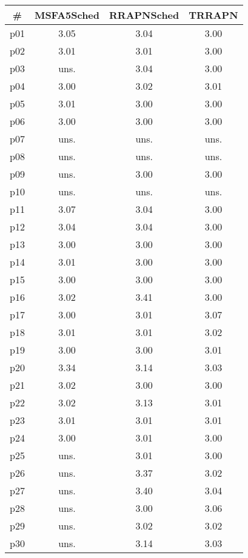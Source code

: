 \begin{tabular}{cccc}
\toprule
\textbf{\#} & \textbf{MSFA5Sched} & \textbf{RRAPNSched} & \textbf{TRRAPN}\\
\midrule
p01 & 3.05 & 3.04 & 3.00\\
p02 & 3.01 & 3.01 & 3.00\\
p03 & uns. & 3.04 & 3.00\\
p04 & 3.00 & 3.02 & 3.01\\
p05 & 3.01 & 3.00 & 3.00\\
p06 & 3.00 & 3.00 & 3.00\\
p07 & uns. & uns. & uns.\\
p08 & uns. & uns. & uns.\\
p09 & uns. & 3.00 & 3.00\\
p10 & uns. & uns. & uns.\\
p11 & 3.07 & 3.04 & 3.00\\
p12 & 3.04 & 3.04 & 3.00\\
p13 & 3.00 & 3.00 & 3.00\\
p14 & 3.01 & 3.00 & 3.00\\
p15 & 3.00 & 3.00 & 3.00\\
p16 & 3.02 & 3.41 & 3.00\\
p17 & 3.00 & 3.01 & 3.07\\
p18 & 3.01 & 3.01 & 3.02\\
p19 & 3.00 & 3.00 & 3.01\\
p20 & 3.34 & 3.14 & 3.03\\
p21 & 3.02 & 3.00 & 3.00\\
p22 & 3.02 & 3.13 & 3.01\\
p23 & 3.01 & 3.01 & 3.01\\
p24 & 3.00 & 3.01 & 3.00\\
p25 & uns. & 3.01 & 3.00\\
p26 & uns. & 3.37 & 3.02\\
p27 & uns. & 3.40 & 3.04\\
p28 & uns. & 3.00 & 3.06\\
p29 & uns. & 3.02 & 3.02\\
p30 & uns. & 3.14 & 3.03\\
\bottomrule
\end{tabular}

